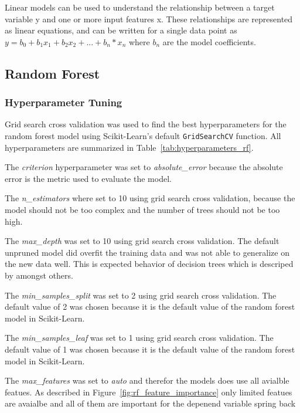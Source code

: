 Linear models can be used to understand the relationship between a target variable y and one or
more input features x. These relationships are represented as linear equations, and can be
written for a single data point as $y = b_0 + b_1x_1 + b_2x_2 + ... + b_n*x_n$ where $b_n$
are the model coefficients.

\subsection{Random Forest}\label{subsec:random-forest}

\subsubsection*{Hyperparameter Tuning}
Grid search cross validation was used to find the best hyperparameters for the random forest
model using
Scikit-Learn's default \texttt{GridSearchCV} function.
All hyperparameters are summarized in Table~\ref{tab:hyperparameters_rf}.

The \textit{criterion} hyperparameter was set to \textit{absolute\_error} because the absolute
error is the metric
used to evaluate the model.

The \textit{n\_estimators} where set to 10 using grid search cross validation, because the model
should not be too
complex and the number of trees should not be too high.

The \textit{max\_depth} was set to 10 using grid search cross validation. The default unpruned
model did overfit the
training data and was not able to generalize on the new data well. This is expected behavior of
decision trees which
is descriped by \cite[p. 133-136]{muller_introductionmachinelearning_2016} amongst others.

The \textit{min\_samples\_split} was set to 2 using grid search cross validation. The default
value of 2 was chosen
because it is the default value of the random forest model in Scikit-Learn.

The \textit{min\_samples\_leaf} was set to 1 using grid search cross validation. The default
value of 1 was chosen
because it is the default value of the random forest model in Scikit-Learn.

The \textit{max\_features} was set to \textit{auto} and therefor the models does use all avialble
featues. As
described in Figure~\ref{fig:rf_feature_importance} only limited featues are avaialbe and all of
them are important
for the depenend variable spring back

